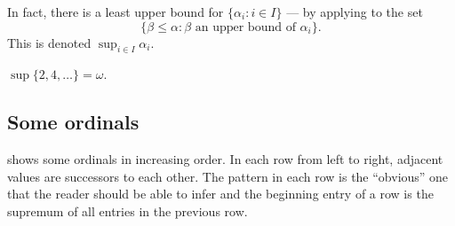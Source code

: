 \documentclass[a4paper]{article}
\begin{document}
In fact, there is a least upper bound for \(\{\alpha_i: i \in I\}\) --- by applying  to the set
\[
  \{\beta \leq \alpha: \beta \text{ an upper bound of } \alpha_i\}.
\]
This is denoted \(\sup_{i \in I} \alpha_i\).

\begin{eg}
  \(\sup \{2, 4, \dots\} = \omega\).
\end{eg}

\subsection{Some ordinals}

 shows some ordinals in increasing order. In each row from left to right, adjacent values are successors to each other. The pattern in each row is the ``obvious'' one that the reader should be able to infer and the beginning entry of a row is the supremum of all entries in the previous row.
\end{document}
